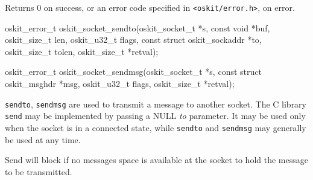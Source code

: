 \begin{apiret}
        Returns 0 on success, or an error code specified in
        {\tt <oskit/error.h>}, on error.
\end{apiret}

%
%

\begin{apisyn}

        \funcproto oskit_error_t
	oskit_socket_sendto(oskit_socket_t *s, 
		    const void *buf,
                    oskit_size_t len, 
		    oskit_u32_t flags,
                    const struct oskit_sockaddr *to, 
		    oskit_size_t tolen,
                    \outparam oskit_size_t *retval);

        \funcproto oskit_error_t
        oskit_socket_sendmsg(oskit_socket_t *s,
                    const struct oskit_msghdr *msg, 
		    oskit_u32_t flags,
                    \outparam oskit_size_t *retval);

\end{apisyn}

\begin{apidesc}
	\texttt{sendto}, \texttt{sendmsg} are used to transmit
	a message to another socket. 
	The C library \texttt{send} may be implemented by passing a
	NULL \emph{to} parameter. It may be used only when the socket 
	is in a connected state, while \texttt{sendto} and 
	\texttt{sendmsg} may generally be used at any time.

	Send will block if no messages space is available at the socket 
	to hold the message to be transmitted.

\end{apidesc}


